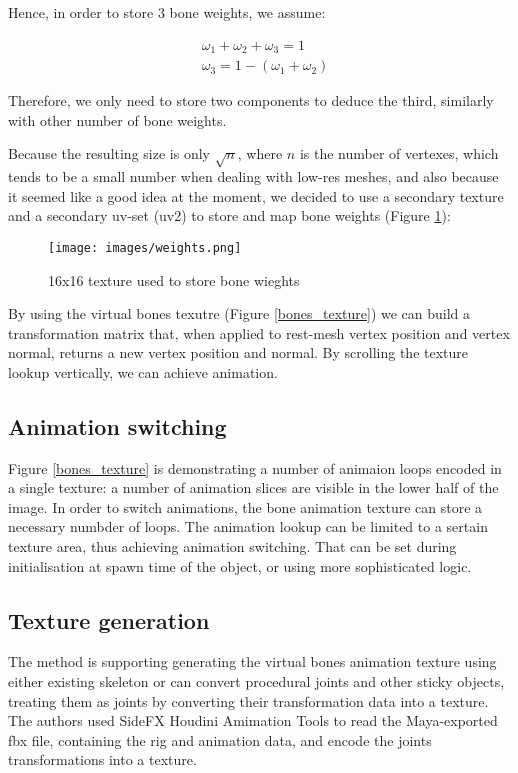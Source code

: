 \documentclass{acmsiggraph}
\begin{document}
Hence, in order to store 3 bone weights, we assume:

\begin{align*}  
  &\omega_1 + \omega_2 + \omega_3 = 1 \\
  &\omega_3 = 1 - (\omega_1 + \omega_2)
\end{align*}  

Therefore, we only need to store two components to deduce the third, similarly with other number of bone weights.

Because the resulting size is only $ \sqrt n $, where $ n $ is the number of vertexes, which tends to be a small number when dealing with low-res meshes, and also because it seemed like a good idea at the moment, we decided to use a secondary texture and a secondary uv-set (uv2) to store and map bone weights (Figure \ref{weights_texture}):

\begin{figure}[ht]
  \centering
  \texttt{[image: images/weights.png]}
  \caption{16x16 texture used to store bone wieghts}
  \label{weights_texture}
\end{figure}

By using the virtual bones texutre (Figure \ref{bones_texture}) we can build a transformation matrix that, when applied to rest-mesh vertex position and vertex normal, returns a new vertex position and normal.  By scrolling the texture lookup vertically, we can achieve animation.

\subsection{Animation switching}

Figure \ref{bones_texture} is demonstrating a number of animaion loops encoded in a single texture: a number of animation slices are visible in the lower half of the image.  In order to switch animations, the bone animation texture can store a necessary numbder of loops.  The animation lookup can be limited to a sertain texture area, thus achieving animation switching. That can be set during initialisation at spawn time of the object, or using more sophisticated logic.

\subsection{Texture generation}

The method is supporting generating the virtual bones animation texture using either existing skeleton or can convert procedural joints and other sticky objects, treating them as joints by converting their transformation data into a texture. The authors used SideFX Houdini Amimation Tools to read the Maya-exported fbx file, containing the rig and animation data, and encode the joints transformations into a texture.
\end{document}
